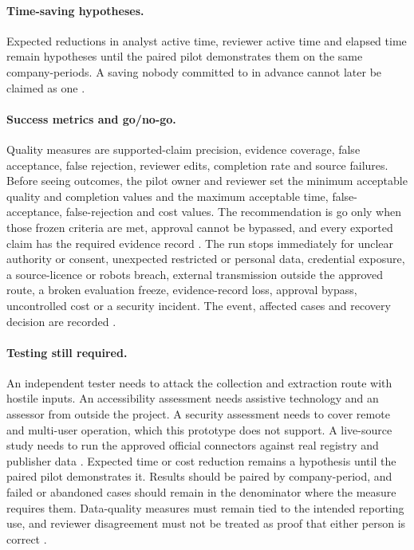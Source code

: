 \paragraph{Time-saving hypotheses.}
Expected reductions in analyst active time, reviewer active time and elapsed time remain hypotheses
until the paired pilot demonstrates them on the same company-periods. A saving nobody committed to
in advance cannot later be claimed as one \citep{nikiforova2020quality,artstein2008agreement}.

\paragraph{Success metrics and go/no-go.}
Quality measures are supported-claim precision, evidence coverage, false acceptance, false rejection,
reviewer edits, completion rate and source failures. Before seeing outcomes, the pilot owner and
reviewer set the minimum acceptable quality and completion values and the maximum acceptable time,
false-acceptance, false-rejection and cost values. The recommendation is go only when those frozen
criteria are met, approval cannot be bypassed, and every exported claim has the required evidence
record \citep{peffers2007dsrm,nist2023airmf}. The run stops immediately for unclear authority or
consent, unexpected restricted or personal data, credential exposure, a source-licence or robots
breach, external transmission outside the approved route, a broken evaluation freeze,
evidence-record loss, approval bypass, uncontrolled cost or a security incident. The event, affected
cases and recovery decision are recorded \citep{cddo2023genai,nist2023airmf}.

\paragraph{Testing still required.}
An independent tester needs to attack the collection and extraction route with hostile inputs. An
accessibility assessment needs assistive technology and an assessor from outside the project. A
security assessment needs to cover remote and multi-user operation, which this prototype does not
support. A live-source study needs to run the approved official connectors against real registry and
publisher data \citep{nist2023airmf,pineau2021reproducibility}. Expected time or cost reduction
remains a hypothesis until the paired pilot demonstrates it. Results should be paired by
company-period, and failed or abandoned cases should remain in the denominator where the measure
requires them. Data-quality measures must remain tied to the intended reporting use, and reviewer
disagreement must not be treated as proof that either person is correct
\citep{nikiforova2020quality,artstein2008agreement}.

